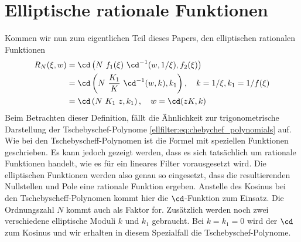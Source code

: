 \section{Elliptische rationale Funktionen}

Kommen wir nun zum eigentlichen Teil dieses Papers, den elliptischen rationalen Funktionen \cite{ellfilter:bib:orfanidis}
\begin{align}
    R_N(\xi, w) &= \cd \left(N~f_1(\xi)~\cd^{-1}(w, 1/\xi), f_2(\xi)\right) \label{ellfilter:eq:elliptic}\\
                &= \cd \left(N~\frac{K_1}{K}~\cd^{-1}(w, k), k_1\right) , \quad k= 1/\xi, k_1 = 1/f(\xi) \\
                &= \cd \left(N~K_1~z , k_1 \right), \quad w= \cd(z K, k)
\end{align}
Beim Betrachten dieser Definition, fällt die Ähnlichkeit zur trigonometrische Darstellung der Tsche\-byschef-Polynome \eqref{ellfilter:eq:chebychef_polynomials} auf.
Wie bei den Tschebyscheff-Polynomen ist die Formel mit speziellen Funktionen geschrieben.
Es kann jedoch gezeigt werden, dass es sich tatsächlich um rationale Funktionen handelt, wie es für ein lineares Filter vorausgesetzt wird.
Die elliptischen Funktionen werden also genau so eingesetzt, dass die resultierenden Nullstellen und Pole eine rationale Funktion ergeben. 
Anstelle des Kosinus bei den Tschebyscheff-Polynomen kommt hier die $\cd$-Funktion zum Einsatz.
Die Ordnungszahl $N$ kommt auch als Faktor for.
Zusätzlich werden noch zwei verschiedene elliptische Moduli $k$ und $k_1$ gebraucht.
Bei $k = k_1 = 0$ wird der $\cd$ zum Kosinus und wir erhalten in diesem Spezialfall die Tschebyschef-Polynome.

